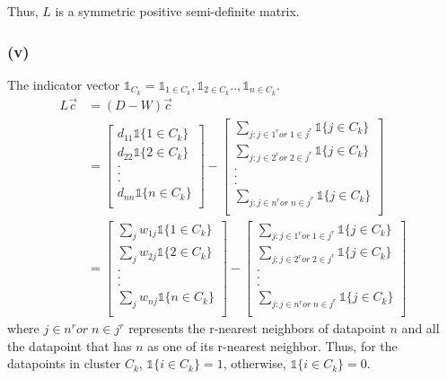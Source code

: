 \documentclass[]{homework}
\begin{document}
Thus, $L$ is a symmetric positive semi-definite matrix.
\subsubsection*{(v)}
The indicator vector $\mathbb{1}_{C_k} = \mathbb{1}_{1 \in C_k},  \mathbb{1}_{2 \in C_k} ..,  \mathbb{1}_{n\in C_k}$. 
\begin{equation}
    \begin{aligned}
        L \Vec{c} &= (D-W)\Vec{c} \\&=\begin{bmatrix}
    d_{11} \mathbb{1}\{1\in C_k\}\\
  d_{22} \mathbb{1}\{2\in C_k\}\\
   .\\
   .\\
  .\\
 d_{nn}\mathbb{1}\{n\in C_k\}\\
  \end{bmatrix}-\begin{bmatrix}
    \sum_{j: j\in 1^r or\;1 \in j^r} \mathbb{1}\{j\in C_k\}\\
  \sum_{j: j\in 2^r or\;2 \in j^r} \mathbb{1}\{j\in C_k\}\\
   .\\
   .\\
  .\\
 \sum_{j: j\in n^r or\;n \in j^r} \mathbb{1}\{j\in C_k\}\\
  \end{bmatrix}\\&=\begin{bmatrix}
    \sum_j w_{1j} \mathbb{1}\{1\in C_k\}\\
  \sum_j w_{2j} \mathbb{1}\{2\in C_k\}\\
   .\\
   .\\
  .\\
  \sum_j w_{nj} \mathbb{1}\{n\in C_k\}\\
  \end{bmatrix}-\begin{bmatrix}
    \sum_{j: j\in 1^r or\;1 \in j^r} \mathbb{1}\{j\in C_k\}\\
  \sum_{j: j\in 2^r or\;2 \in j^r} \mathbb{1}\{j\in C_k\}\\
   .\\
   .\\
  .\\
 \sum_{j: j\in n^r or\;n \in j^r} \mathbb{1}\{j\in C_k\}\\
  \end{bmatrix}
    \end{aligned}
\end{equation}
where $j\in n^r or\;n \in j^r$ represents the r-nearest neighbors of datapoint $n$ and all the datapoint that has $n$ as one of its r-nearest neighbor. Thus, for the datapoints in cluster $C_k$,  $\mathbb{1}\{i\in C_k\} =1$, otherwise, $ \mathbb{1}\{i\in C_k\} =0$. 
\end{document}

